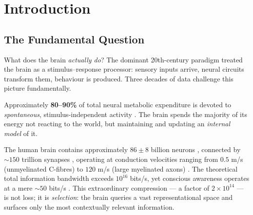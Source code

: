 \documentclass[12pt,a4paper]{article}
\theoremstyle{plain}
\theoremstyle{definition}
\theoremstyle{remark}
\begin{document}
\newpage
\tableofcontents
\newpage

\section{Introduction}
\label{sec:intro}

\subsection{The Fundamental Question}

What does the brain \emph{actually do}?
The dominant 20th-century paradigm treated the brain as a stimulus--response processor:
sensory inputs arrive, neural circuits transform them, behaviour is produced. Three decades of data challenge this picture fundamentally.

\begin{tcolorbox}[notebox, title={Key Empirical Fact}]
Approximately \textbf{80--90\%} of total neural metabolic expenditure is devoted to \emph{spontaneous}, stimulus-independent activity \citep{Raichle2006}.
The brain spends the majority of its energy not reacting to the world, but maintaining and updating an \emph{internal model} of it.
\end{tcolorbox}

The human brain contains approximately $86 \pm 8$ billion neurons \citep{Azevedo2009}, connected by $\sim\!150$ trillion synapses \citep{Drachman2005}, operating at conduction velocities ranging from $0.5$ m/s (unmyelinated C-fibres) to $120$ m/s (large myelinated axons) \citep{Kandel2013}.
The theoretical total information bandwidth exceeds $10^{16}$ bits/s, yet conscious awareness operates at a mere $\sim\!50$ bits/s \citep{Norretranders1998}.
This extraordinary compression — a factor of $2 \times 10^{14}$ — is not loss;
it is \emph{selection}: the brain queries a vast representational space and surfaces only the most contextually relevant information.
\end{document}
